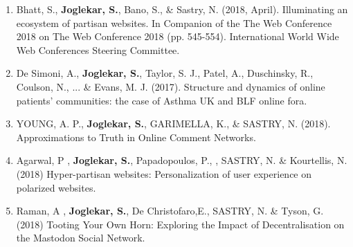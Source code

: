 \begin{enumerate}
    \item Bhatt, S., \textbf{Joglekar, S.}, Bano, S., \& Sastry, N. (2018, April). Illuminating an ecosystem of partisan websites. In Companion of the The Web Conference 2018 on The Web Conference 2018 (pp. 545-554). International World Wide Web Conferences Steering Committee.
    
    \item De Simoni, A., \textbf{Joglekar, S.}, Taylor, S. J., Patel, A., Duschinsky, R., Coulson, N., ... \& Evans, M. J. (2017). Structure and dynamics of online patients’ communities: the case of Asthma UK and BLF online fora.
    
    \item YOUNG, A. P., \textbf{Joglekar, S.}, GARIMELLA, K., \& SASTRY, N. (2018). Approximations to Truth in Online Comment Networks.
    
    \item Agarwal, P , \textbf{Joglekar, S.}, Papadopoulos, P., , SASTRY, N. \& Kourtellis, N. (2018) Hyper-partisan websites: Personalization of user experience on
    polarized websites.
    
    
    \item Raman, A , \textbf{Joglekar, S.}, De Christofaro,E., SASTRY, N. \& Tyson, G. (2018) Tooting Your Own Horn: Exploring the Impact of
    Decentralisation on the Mastodon Social Network.
    


\end{enumerate}








